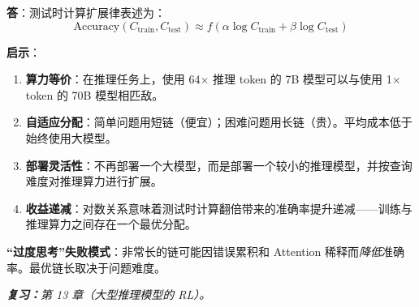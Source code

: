 \begin{questionbox}
\textbf{答}：测试时计算扩展律表述为：
\[
\text{Accuracy}(C_{\text{train}}, C_{\text{test}}) \approx f(\alpha \log C_{\text{train}} + \beta \log C_{\text{test}})
\]

\textbf{启示}：

\begin{enumerate}
  \item \textbf{算力等价}：在推理任务上，使用 64$\times$ 推理 token 的 7B 模型可以与使用 1$\times$ token 的 70B 模型相匹敌。
  \item \textbf{自适应分配}：简单问题用短链（便宜）；困难问题用长链（贵）。平均成本低于始终使用大模型。
  \item \textbf{部署灵活性}：不再部署一个大模型，而是部署一个较小的推理模型，并按查询难度对推理算力进行扩展。
  \item \textbf{收益递减}：对数关系意味着测试时计算翻倍带来的准确率提升递减——训练与推理算力之间存在一个最优分配。
\end{enumerate}

\textbf{“过度思考”失败模式}：非常长的链可能因错误累积和 Attention 稀释而\emph{降低}准确率。最优链长取决于问题难度。

\emph{\textbf{复习：}第 13 章（大型推理模型的 RL）。}
\end{questionbox}

